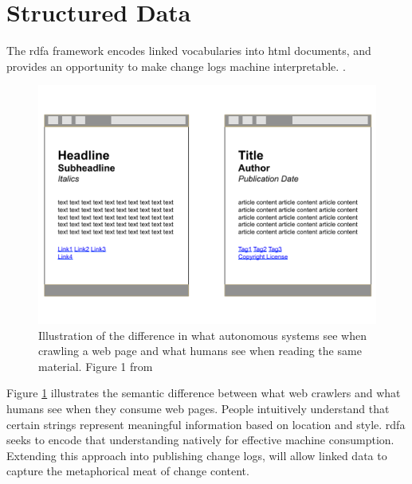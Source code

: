 \section{Structured Data}

The \gls{rdfa} framework encodes \gls{linked} vocabularies into \gls{html} documents, and provides an opportunity to make change logs machine interpretable. \cite{Adida2015}.
\begin{figure}
	\centering
	\includegraphics[scale=0.40]{figures/RDFaSemantics.png}
	\caption[Illustration of the difference in what autonomous systems see when crawling a web page and what humans see when reading the same material.]{Illustration of the difference in what autonomous systems see when crawling a web page and what humans see when reading the same material. Figure 1 from \cite{Herman2015}}
	\label{RDFa}
\end{figure}Figure \ref{RDFa} illustrates the semantic difference between what web crawlers and what humans see when they consume web pages.
People intuitively understand that certain strings represent meaningful information based on location and style.
\gls{rdfa} seeks to encode that understanding natively for effective machine consumption.
Extending this approach into publishing change logs, will allow linked data to capture the metaphorical meat of change content.

